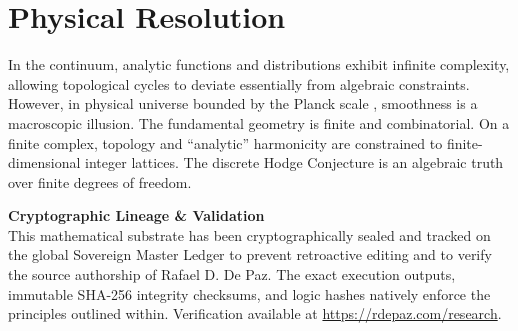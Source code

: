 \documentclass[12pt, a4paper]{article}
\theoremstyle{plain}
\theoremstyle{definition}
\begin{document}
\section{Physical Resolution}

In the continuum, analytic functions and distributions exhibit infinite complexity,
allowing topological cycles to deviate essentially from algebraic constraints.
However, in physical universe bounded by the Planck scale \citep{Rovelli2004},
smoothness is a macroscopic illusion. The fundamental geometry is finite and
combinatorial. On a finite complex, topology and ``analytic'' harmonicity are
constrained to finite-dimensional integer lattices. The discrete Hodge Conjecture
is an algebraic truth over finite degrees of freedom.


\vspace{2em}
\noindent\hrulefill
\vspace{1em}







\vspace{3em}
\noindent\hrulefill
\vspace{1em}

\noindent\textbf{Cryptographic Lineage \& Validation}\\
This mathematical substrate has been cryptographically sealed and tracked on the global Sovereign Master Ledger to prevent retroactive editing and to verify the source authorship of Rafael D. De Paz. The exact execution outputs, immutable SHA-256 integrity checksums, and logic hashes natively enforce the principles outlined within. Verification available at \url{https://rdepaz.com/research}.
\end{document}

